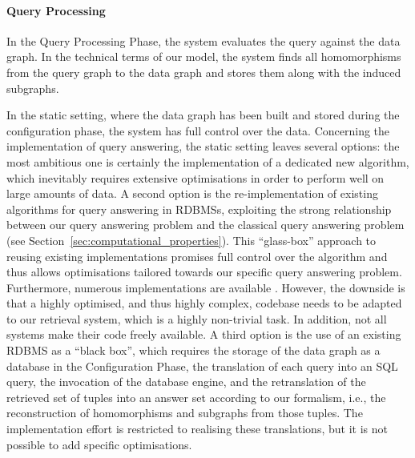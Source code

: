 \paragraph{Query Processing}

In the Query Processing Phase, the system evaluates the query against the
data graph.
In the technical terms of our model, the system finds all homomorphisms from the query graph
to the data graph and stores them along with the induced subgraphs.

In the static setting, where the data graph has been built and stored during the
configuration phase, the system has full control over the data.
Concerning the implementation of query answering,
the static setting leaves several options:
the most ambitious one is certainly the implementation of a dedicated new
algorithm, which inevitably requires extensive optimisations in order to perform
well on large amounts of data.
A second option is the re-implementation of existing algorithms
for query answering in \glspl{RDBMS}, exploiting the strong relationship
between our query answering problem and the classical query answering problem
(see Section~\ref{sec:computational_properties}).
This \enquote{glass-box} approach to reusing existing implementations promises
full control over the algorithm and thus allows optimisations tailored
towards our specific query answering problem.
Furthermore, numerous implementations are available \autocite[cf.][]{WikiSQLRDBMSs}.
However, the downside is that a highly optimised, and thus highly complex,
codebase needs to be adapted to our retrieval system, which is a
highly non-trivial task. In addition, not all systems make their code freely available.
A third option is the use of an existing \gls{RDBMS} as a \enquote{black box},
which requires the storage of the data graph as a database in the Configuration Phase,
the translation of each query into an SQL query,
the invocation of the database engine,
and the retranslation of the retrieved set of tuples
into an answer set according to our formalism, i.e.,
the reconstruction of homomorphisms and subgraphs from those tuples.
The implementation effort is restricted to realising these translations,
but it is not possible to add specific optimisations.

